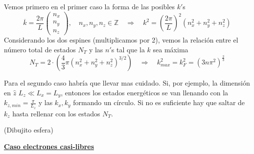 \documentclass[leqno]{article}
\begin{document}
Vemos primero en el primer caso la forma de las posibles $k'$s
\[
  \overline{k} = \frac{2\pi }{L} \begin{pmatrix} n_x\\n_y\\n_z \end{pmatrix}, \quad n_x, n_y, n_z\in \mathbb{Z} \quad \Rightarrow \quad k^2 = \left( \frac{2\pi }{L} \right)^2 (n_x^2+n_y^2+n_z^2)  
\] 
Considerando los dos espines (multiplicamos por 2), vemos la relación entre el número total de estados $N_T$ y las $n'$s tal que la $k$ sea máxima
\[
N_T = 2 \cdot \left( \frac{4}{3}\pi (n_x^2+n_y^2+n_z^2)^{3 / 2} \right) \quad \Rightarrow \quad k_{max}^2 = k_F^2 = (3n\pi ^2) ^{ \frac{2}{3}}
\] 

Para el segundo caso habría que llevar mas cuidado. Si, por ejemplo, la dimensión en $\hat{z}$ $L_z\ll L_x=L_y$, entonces los estados energéticos se van llenando con la $k_{z, min} = \frac{\pi}{L_z}$ y las $k_x, k_y$ formando un círculo. Si no es suficiente hay que saltar de  $k_z$ hasta rellenar con los estados $N_T$.

(Dibujito esfera)

\underline{\textbf{Caso electrones casi-libres}}
\end{document}
